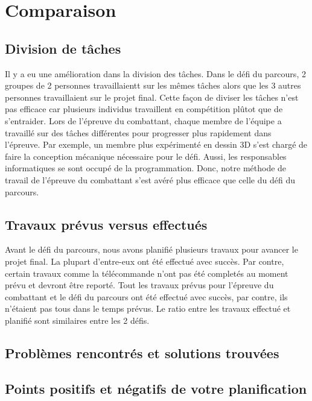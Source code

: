\section{Comparaison}


\subsection{Division de tâches}

Il y a eu une amélioration dans la division des tâches. Dans le défi du parcours, 2 groupes de 2 personnes travaillaientt sur les mêmes tâches alors que les 3 autres personnes travaillaient sur le projet final. Cette façon de diviser les tâches n'est pas efficace car plusieurs individus travaillent en compétition plûtot que de s'entraider. Lors de l'épreuve du combattant, chaque membre de l'équipe a travaillé sur des tâches différentes pour progresser plus rapidement dans l'épreuve. Par exemple, un membre plus expérimenté en dessin 3D s'est chargé de faire la conception mécanique nécessaire pour le défi. Aussi, les responsables informatiques se sont occupé de la programmation.  Donc, notre méthode de travail de l'épreuve du combattant s'est avéré plus efficace que celle du défi du parcours.

\subsection{Travaux prévus versus effectués}

Avant le défi du parcours, nous avons planifié plusieurs travaux pour avancer le projet final. La plupart d'entre-eux ont été effectué avec succès. Par contre, certain travaux comme la télécommande n'ont pas été completés au moment prévu et devront être reporté. Tout les travaux prévus pour l'épreuve du combattant et le défi du parcours ont été effectué avec succès, par contre, ils n'étaient pas tous dans le temps prévus. Le ratio entre les travaux effectué et planifié sont similaires entre les 2 défis.

\subsection{Problèmes rencontrés et solutions trouvées}


\subsection{Points positifs et négatifs de votre planification}

